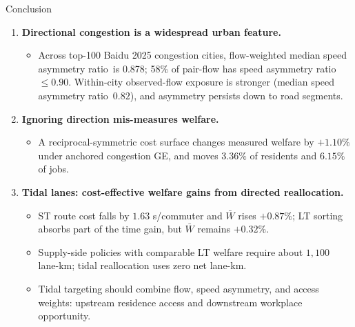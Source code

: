 \documentclass[11pt,aspectratio=169]{beamer}
\newcommand{\good}[1]{\textcolor{blue!70!black}{#1}}
\newcommand{\bad}[1]{\textcolor{red!70!black}{#1}}
\newcommand{\SAR}{speed asymmetry ratio}
\begin{document}
\begin{frame}{Conclusion}
\begin{enumerate}
  \item \textbf{Directional congestion is a widespread urban feature.}
  \begin{itemize}\footnotesize
    \item Across top-100 Baidu 2025 congestion cities, flow-weighted median \SAR\ is \good{0.878}; \good{58\%} of pair-flow has \SAR\ $\leq0.90$. Within-city observed-flow exposure is stronger (median \SAR\ $0.82$), and asymmetry persists down to road segments.
  \end{itemize}
  \item \textbf{Ignoring direction mis-measures welfare.}
  \begin{itemize}\footnotesize
    \item A reciprocal-symmetric cost surface changes measured welfare by \good{$+1.10\%$} under anchored congestion GE, and moves \good{$3.36\%$} of residents and \good{$6.15\%$} of jobs.
  \end{itemize}
  \item \textbf{Tidal lanes: cost-effective welfare gains from directed reallocation.}
  \begin{itemize}\footnotesize
    \item ST route cost falls by \good{$1.63$ s/commuter} and $\bar W$ rises \good{$+0.87\%$}; LT sorting absorbs part of the time gain, but $\bar W$ remains \good{$+0.32\%$}.
    \item Supply-side policies with comparable LT welfare require about \bad{$1{,}100$ lane-km}; tidal reallocation uses \good{zero net lane-km}.
    \item Tidal targeting should combine flow, speed asymmetry, and access weights: upstream residence access and downstream workplace opportunity.
  \end{itemize}
\end{enumerate}
\end{frame}

\end{document}
